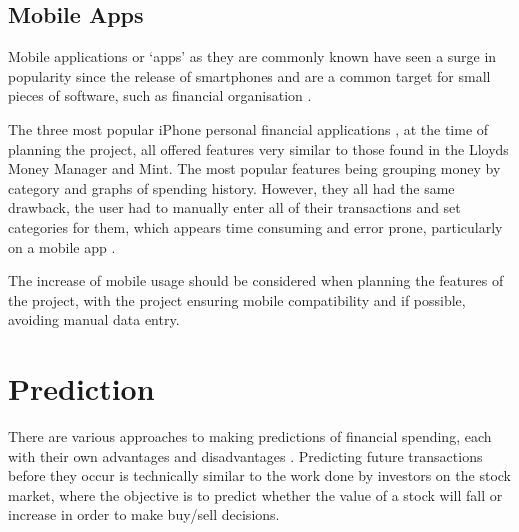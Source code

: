 \subsection{Mobile Apps}
Mobile applications or `apps' as they are commonly known have seen a surge in popularity since the release of smartphones and are a common target for small pieces of software, such as financial organisation \parencite{purcell2011half}.

The three most popular iPhone personal financial applications \cite{itunes2013topapps}, at the time of planning the project, all offered features very similar to those found in the Lloyds Money Manager and Mint. The most popular features being grouping money by \gls{category} and graphs of spending history.
% 
However, they all had the same drawback, the user had to manually enter all of their transactions and set categories for them, which appears time consuming and error prone, particularly on a mobile app \cite{spendee2014spendee,budgt2013budgt,bluetags2014pocket}.

The increase of mobile usage should be considered when planning the features of the project, with the project ensuring mobile compatibility and if possible, avoiding manual data entry. 

\section{Prediction}

There are various approaches to making predictions of financial spending, each with their own advantages and disadvantages . Predicting future transactions before they occur is technically similar to the work done by investors on the stock market, where the objective is to predict whether the value of a stock will fall or increase in order to make buy/sell decisions.

